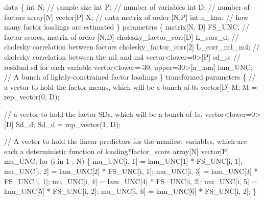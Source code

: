 \documentclass[
  letterpaper,
  DIV=11,
  numbers=noendperiod]{scrreprt}
\newenvironment{Shaded}{\begin{snugshade}}{\end{snugshade}}
\newcommand{\CommentTok}[1]{\textcolor[rgb]{0.37,0.37,0.37}{#1}}
\newcommand{\ControlFlowTok}[1]{\textcolor[rgb]{0.00,0.23,0.31}{#1}}
\newcommand{\DataTypeTok}[1]{\textcolor[rgb]{0.68,0.00,0.00}{#1}}
\newcommand{\DecValTok}[1]{\textcolor[rgb]{0.68,0.00,0.00}{#1}}
\newcommand{\KeywordTok}[1]{\textcolor[rgb]{0.00,0.23,0.31}{#1}}
\newcommand{\NormalTok}[1]{\textcolor[rgb]{0.00,0.23,0.31}{#1}}
\begin{document}
\begin{Shaded}
\begin{Highlighting}[]
\KeywordTok{data}\NormalTok{ \{}
  \DataTypeTok{int}\NormalTok{ N; }\CommentTok{// sample size}
  \DataTypeTok{int}\NormalTok{ P; }\CommentTok{// number of variables}
  \DataTypeTok{int}\NormalTok{ D; }\CommentTok{// number of factors}
  \DataTypeTok{array}\NormalTok{[N] }\DataTypeTok{vector}\NormalTok{[P] X; }\CommentTok{// data matrix of order [N,P]}
  \DataTypeTok{int}\NormalTok{ n\_lam; }\CommentTok{// how many factor loadings are estimated}
\NormalTok{\}}
\KeywordTok{parameters}\NormalTok{ \{}
  \DataTypeTok{matrix}\NormalTok{[N, D] FS\_UNC; }\CommentTok{// factor scores, matrix of order [N,D]}
  \DataTypeTok{cholesky\_factor\_corr}\NormalTok{[D] L\_corr\_d; }\CommentTok{// cholesky correlation between factors}
  \DataTypeTok{cholesky\_factor\_corr}\NormalTok{[}\DecValTok{2}\NormalTok{] L\_corr\_m1\_m4; }\CommentTok{// cholesky correlation between the m1 and m4}
  \DataTypeTok{vector}\NormalTok{\textless{}}\KeywordTok{lower}\NormalTok{=}\DecValTok{0}\NormalTok{\textgreater{}[P] sd\_p; }\CommentTok{// residual sd for each variable}
  \DataTypeTok{vector}\NormalTok{\textless{}}\KeywordTok{lower}\NormalTok{={-}}\DecValTok{30}\NormalTok{, }\KeywordTok{upper}\NormalTok{=}\DecValTok{30}\NormalTok{\textgreater{}[n\_lam] lam\_UNC; }\CommentTok{// A bunch of lightly{-}constrained factor loadings}
\NormalTok{\}}
\KeywordTok{transformed parameters}\NormalTok{ \{}
  \CommentTok{// a vector to hold the factor means, which will be a bunch of 0s}
  \DataTypeTok{vector}\NormalTok{[D] M;}
\NormalTok{  M = rep\_vector(}\DecValTok{0}\NormalTok{, D);}
  
  \CommentTok{// a vector to hold the factor SDs, which will be a bunch of 1s. }
  \DataTypeTok{vector}\NormalTok{\textless{}}\KeywordTok{lower}\NormalTok{=}\DecValTok{0}\NormalTok{\textgreater{}[D] Sd\_d;}
\NormalTok{  Sd\_d = rep\_vector(}\DecValTok{1}\NormalTok{, D);}
  
  \CommentTok{// A vector to hold the linear predictors for the manifest variables, which are each a deterministic function of loading*factor\_score}
  \DataTypeTok{array}\NormalTok{[N] }\DataTypeTok{vector}\NormalTok{[P] mu\_UNC;}
  \ControlFlowTok{for}\NormalTok{ (i }\ControlFlowTok{in} \DecValTok{1}\NormalTok{ : N) \{}
\NormalTok{    mu\_UNC[i, }\DecValTok{1}\NormalTok{] = lam\_UNC[}\DecValTok{1}\NormalTok{] * FS\_UNC[i, }\DecValTok{1}\NormalTok{];}
\NormalTok{    mu\_UNC[i, }\DecValTok{2}\NormalTok{] = lam\_UNC[}\DecValTok{2}\NormalTok{] * FS\_UNC[i, }\DecValTok{1}\NormalTok{];}
\NormalTok{    mu\_UNC[i, }\DecValTok{3}\NormalTok{] = lam\_UNC[}\DecValTok{3}\NormalTok{] * FS\_UNC[i, }\DecValTok{1}\NormalTok{];}
\NormalTok{    mu\_UNC[i, }\DecValTok{4}\NormalTok{] = lam\_UNC[}\DecValTok{4}\NormalTok{] * FS\_UNC[i, }\DecValTok{2}\NormalTok{];}
\NormalTok{    mu\_UNC[i, }\DecValTok{5}\NormalTok{] = lam\_UNC[}\DecValTok{5}\NormalTok{] * FS\_UNC[i, }\DecValTok{2}\NormalTok{];}
\NormalTok{    mu\_UNC[i, }\DecValTok{6}\NormalTok{] = lam\_UNC[}\DecValTok{6}\NormalTok{] * FS\_UNC[i, }\DecValTok{2}\NormalTok{];}
\NormalTok{  \}}
  

\end{Highlighting}
\end{Shaded}
\end{document}
